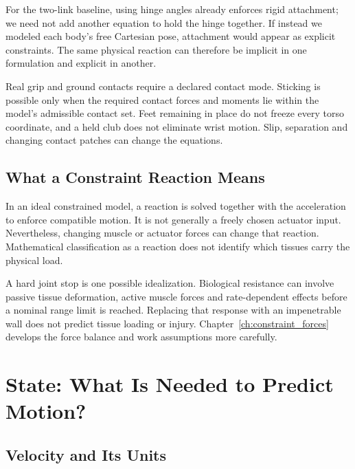 For the two-link baseline, using hinge angles already enforces rigid attachment; we need not add another equation to hold the hinge together. If instead we modeled each body's free Cartesian pose, attachment would appear as explicit constraints. The same physical reaction can therefore be implicit in one formulation and explicit in another.

Real grip and ground contacts require a declared contact mode. Sticking is possible only when the required contact forces and moments lie within the model's admissible contact set. Feet remaining in place do not freeze every torso coordinate, and a held club does not eliminate wrist motion. Slip, separation and changing contact patches can change the equations.

\subsection{What a Constraint Reaction Means}\label{ch02:what-a-constraint-reaction-means}

\protect{}\label{box:ch02_constraints_walls}{}

In an ideal constrained model, a reaction is solved together with the acceleration to enforce compatible motion. It is not generally a freely chosen actuator input. Nevertheless, changing muscle or actuator forces can change that reaction. Mathematical classification as a reaction does not identify which tissues carry the physical load.

A hard joint stop is one possible idealization. Biological resistance can involve passive tissue deformation, active muscle forces and rate-dependent effects before a nominal range limit is reached. Replacing that response with an impenetrable wall does not predict tissue loading or injury. Chapter~\ref{ch:constraint_forces} develops the force balance and work assumptions more carefully.

\section{State: What Is Needed to Predict Motion?}\label{ch02:state-what-is-needed-to-predict-motion}

\protect{}\label{ch02:state-position-and-velocity}{}

\subsection{Velocity and Its Units}\label{ch02:velocity-and-its-units}

